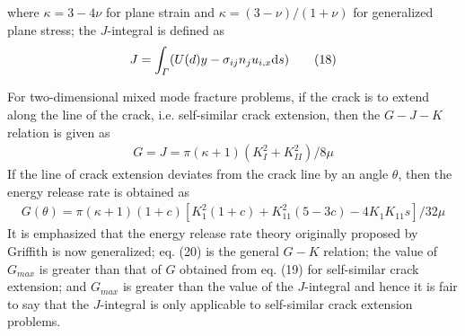 \documentclass[12pt]{article}
\begin{document}
where $\kappa = 3 - 4 \nu$ for plane strain and $\kappa = (3 - \nu)/(1 + \nu)$ for generalized plane stress;
the $J$-integral is defined as
\begin{align*}
    J = \int_\varGamma (U \text(d)y - \sigma_{ij} n_j u_{i, x}\text{d}s) \tag{18} \label{18}
\end{align*}

For two-dimensional mixed mode fracture problems, if the crack is to extend along the line
of the crack, i.e. self-similar crack extension, then the $G - J - K$ relation is given as
\begin{align*}
    G = J = \pi (\kappa + 1)(K_{I}^{2} + K_{II}^{2})/8\mu \tag{19} \label{19}
\end{align*}
If the line of crack extension deviates from the crack line by an angle $\theta$, then the energy release
rate is obtained as
\begin{align*}
    G(\theta) = \pi(\kappa + 1)(1 + c)[K_{1}^{2}(1+c) + K_{11}^2(5-3c)-4K_{1}K_{11}s]/32\mu \tag{20} \label{20}
\end{align*}
It is emphasized that the energy release rate theory originally proposed by Griffith is now
generalized; eq. (20) is the general $G - K$ relation; the value of $G_{max}$ is greater than that of $G$ obtained
from eq. (19) for self-similar crack extension; and $G_{max}$ is greater than the value of the $J$-integral
and hence it is fair to say that the $J$-integral is only applicable to self-similar crack extension
problems.
\end{document}
